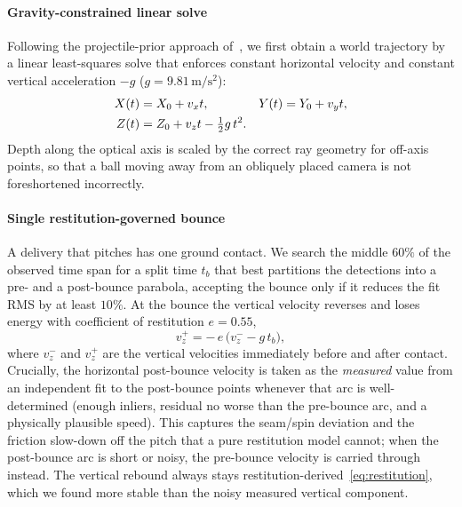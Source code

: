 \documentclass[journal]{IEEEtran}
\begin{document}
\paragraph*{Gravity-constrained linear solve} Following the projectile-prior
approach of~\cite{ribnick2009projectiles}, we first obtain a world trajectory by
a linear least-squares solve that enforces constant horizontal velocity and
constant vertical acceleration $-g$ ($g=9.81\,\mathrm{m/s^2}$):
\begin{align}
X(t)&=X_0+v_x t, & Y(t)&=Y_0+v_y t,\notag\\
Z(t)&=Z_0+v_z t-\tfrac{1}{2}g\,t^2.
\label{eq:proj_motion}
\end{align}
Depth along the optical axis is scaled by the correct ray geometry for off-axis
points, so that a ball moving away from an obliquely placed camera is not
foreshortened incorrectly.

\paragraph*{Single restitution-governed bounce} A delivery that pitches has one
ground contact. We search the middle $60\%$ of the observed time span for a
split time $t_b$ that best partitions the detections into a pre- and a
post-bounce parabola, accepting the bounce only if it reduces the fit RMS by at
least $10\%$. At the bounce the vertical velocity reverses and loses energy with
coefficient of restitution $e=0.55$,
\begin{equation}
v_z^{+}=-\,e\,\bigl(v_z^{-}-g\,t_b\bigr),
\label{eq:restitution}
\end{equation}
where $v_z^{-}$ and $v_z^{+}$ are the vertical velocities immediately before and
after contact. Crucially, the horizontal post-bounce velocity is taken as the
\emph{measured} value from an independent fit to the post-bounce points whenever
that arc is well-determined (enough inliers, residual no worse than the
pre-bounce arc, and a physically plausible speed). This captures the seam/spin
deviation and the friction slow-down off the pitch that a pure restitution model
cannot; when the post-bounce arc is short or noisy, the pre-bounce velocity is
carried through instead. The vertical rebound always stays
restitution-derived~\eqref{eq:restitution}, which we found more stable than the
noisy measured vertical component.
\end{document}
